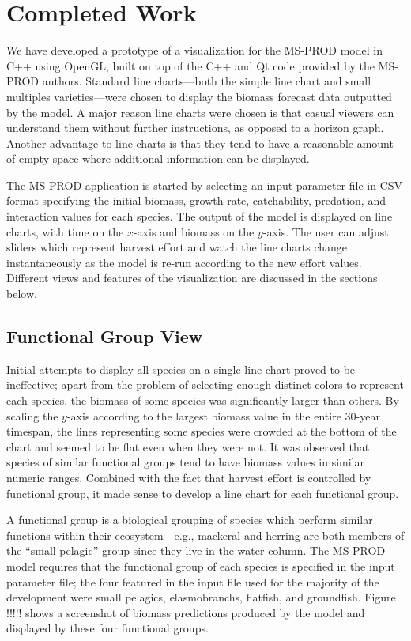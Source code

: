\chapter{Completed Work}

We have developed a prototype of a visualization for the MS-PROD model in C++ using OpenGL, built on top of the C++ and Qt code provided by the MS-PROD authors.  Standard line charts---both the simple line chart and small multiples varieties---were chosen to display the biomass forecast data outputted by the model.  A major reason line charts were chosen is that casual viewers can understand them without further instructions, as opposed to a horizon graph.  Another advantage to line charts is that they tend to have a reasonable amount of empty space where additional information can be displayed.

The MS-PROD application is started by selecting an input parameter file in CSV format specifying the initial biomass, growth rate, catchability, predation, and interaction values for each species.  The output of the model is displayed on line charts, with time on the $x$-axis and biomass on the $y$-axis.  The user can adjust sliders which represent harvest effort and watch the line charts change instantaneously as the model is re-run according to the new effort values.  Different views and features of the visualization are discussed in the sections below.  

\section{Functional Group View}

Initial attempts to display all species on a single line chart proved to be ineffective; apart from the problem of selecting enough distinct colors to represent each species, the biomass of some species was significantly larger than others.  By scaling the $y$-axis according to the largest biomass value in the entire 30-year timespan, the lines representing some species were crowded at the bottom of the chart and seemed to be flat even when they were not.  It was observed that species of similar functional groups tend to have biomass values in similar numeric ranges.  Combined with the fact that harvest effort is controlled by functional group, it made sense to develop a line chart for each functional group.

A functional group is a biological grouping of species which perform similar functions within their ecosystem---e.g., mackeral and herring are both members of the ``small pelagic'' group since they live in the water column.  The MS-PROD model requires that the functional group of each species is specified in the input parameter file; the four featured in the input file used for the majority of the development were small pelagics, elasmobranchs, flatfish, and groundfish.  Figure !!!!! shows a screenshot of biomass predictions produced by the model and displayed by these four functional groups.

